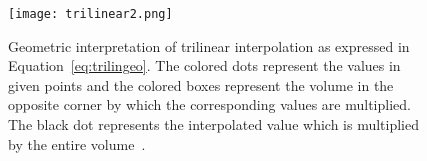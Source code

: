 				\begin{figure}
					\centering
					\texttt{[image: trilinear2.png]}
					\caption{Geometric interpretation of trilinear interpolation as expressed in Equation~\ref{eq:trilingeo}. The colored dots represent the values in given points and the colored boxes represent the volume in the opposite corner by which the corresponding values are multiplied. The black dot represents the interpolated value which is multiplied by the entire volume~\cite{trilinear}.}
					\label{fig:trilin2}
				\end{figure}
				
